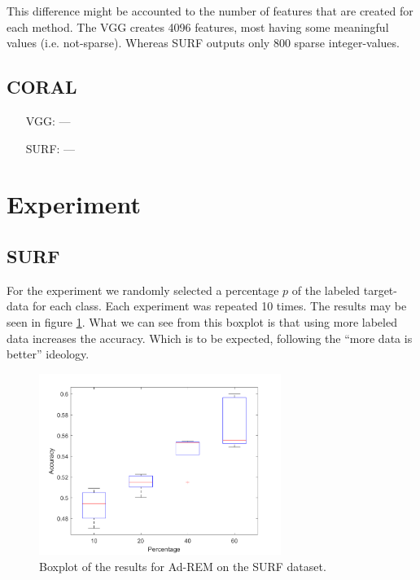 \documentclass[11pt]{article}
\begin{document}
This difference might be accounted to the number of features that are created for each method. The VGG creates 4096 features, most having some meaningful values (i.e. not-sparse). Whereas SURF outputs only 800 sparse integer-values.

\subsection{CORAL}
\begin{itemize}
	\item[VGG:] ---
	\item[SURF:] ---
\end{itemize}

\section{Experiment}

\subsection{SURF}
For the experiment we randomly selected a percentage $p$ of the labeled target-data for each class. Each experiment was repeated 10 times. The results may be seen in figure \ref{fig:adrem_results}. What we can see from this boxplot is that using more labeled data increases the accuracy. Which is to be expected, following the ``more data is better'' ideology. 

\begin{figure}[H]
	\centering
	\includegraphics[width=0.7\textwidth]{images/adrem_results.png}
	\caption{Boxplot of the results for Ad-REM on the SURF dataset.}
	\label{fig:adrem_results}
\end{figure}
\end{document}
